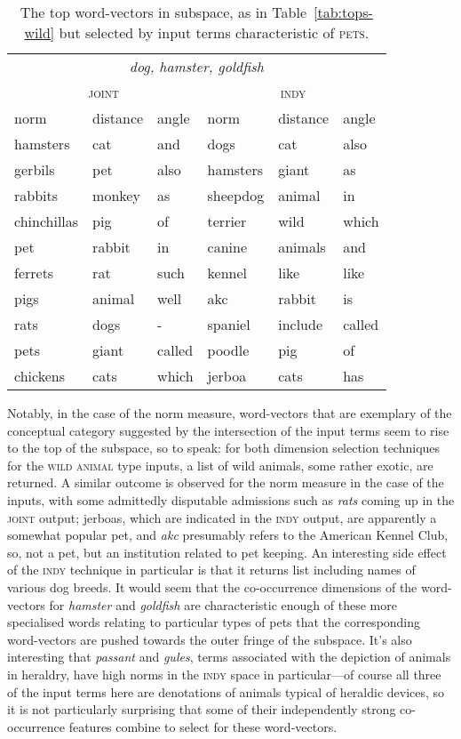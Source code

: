 \begin{table}
\centering
\begin{tabular}{lll|lll}
\hline
\multicolumn{6}{c}{\emph{dog, hamster, goldfish}} \\
\multicolumn{3}{c}{\textsc{joint}} & \multicolumn{3}{c}{\textsc{indy}} \\
\hline
norm & distance & angle & norm & distance & angle \\
\hline
hamsters & cat & and & dogs & cat & also \\
gerbils & pet & also & hamsters & giant & as \\
rabbits & monkey & as & sheepdog & animal & in \\
chinchillas & pig & of & terrier & wild & which \\
pet & rabbit & in & canine & animals & and \\
ferrets & rat & such & kennel & like & like \\
pigs & animal & well & akc & rabbit & is \\
rats & dogs & - & spaniel & include & called \\
pets & giant & called & poodle & pig & of \\
chickens & cats & which & jerboa & cats & has \\
\hline
\end{tabular}
\caption{The top word-vectors in subspace, as in Table~\ref{tab:tops-wild} but selected by input terms characteristic of \textsc{pets}.}
\label{tab:tops-pet}
\end{table}

Notably, in the case of the norm measure, word-vectors that are exemplary of the conceptual category suggested by the intersection of the input terms seem to rise to the top of the subspace, so to speak: for both dimension selection techniques for the \textsc{wild animal} type inputs, a list of wild animals, some rather exotic, are returned.  A similar outcome is observed for the norm measure in the case of the  inputs, with some admittedly disputable admissions such as \emph{rats} coming up in the \textsc{joint} output; jerboas, which are indicated in the \textsc{indy} output, are apparently a somewhat popular pet, and \emph{akc} presumably refers to the American Kennel Club, so, not a pet, but an institution related to pet keeping.  An interesting side effect of the \textsc{indy} technique in particular is that it returns list including names of various dog breeds.  It would seem that the co-occurrence dimensions of the word-vectors for \emph{hamster} and \emph{goldfish} are characteristic enough of these more specialised words relating to particular types of pets that the corresponding word-vectors are pushed towards the outer fringe of the subspace.  It's also interesting that \emph{passant} and \emph{gules}, terms associated with the depiction of animals in heraldry, have high norms in the \textsc{indy} space in particular---of course all three of the input terms here are denotations of animals typical of heraldic devices, so it is not particularly surprising that some of their independently strong co-occurrence features combine to select for these word-vectors.

